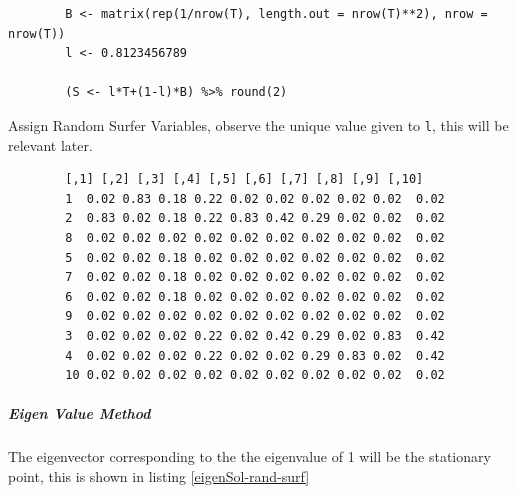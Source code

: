 \documentclass[11pt, twoside]{report}
\begin{document}
\begin{listing}[htbp]
    \begin{tcolorbox}
        \begin{verbatim}
        B <- matrix(rep(1/nrow(T), length.out = nrow(T)**2), nrow = nrow(T))
        l <- 0.8123456789

        (S <- l*T+(1-l)*B) %>% round(2)
        \end{verbatim}
        \caption{\label{r-var-random-surfer}Assign Random Surfer Variables, observe the unique value given to \texttt{l}, this will be relevant later.}
    \tcblower
        \begin{verbatim}
        [,1] [,2] [,3] [,4] [,5] [,6] [,7] [,8] [,9] [,10]
        1  0.02 0.83 0.18 0.22 0.02 0.02 0.02 0.02 0.02  0.02
        2  0.83 0.02 0.18 0.22 0.83 0.42 0.29 0.02 0.02  0.02
        8  0.02 0.02 0.02 0.02 0.02 0.02 0.02 0.02 0.02  0.02
        5  0.02 0.02 0.18 0.02 0.02 0.02 0.02 0.02 0.02  0.02
        7  0.02 0.02 0.18 0.02 0.02 0.02 0.02 0.02 0.02  0.02
        6  0.02 0.02 0.18 0.02 0.02 0.02 0.02 0.02 0.02  0.02
        9  0.02 0.02 0.02 0.02 0.02 0.02 0.02 0.02 0.02  0.02
        3  0.02 0.02 0.02 0.22 0.02 0.42 0.29 0.02 0.83  0.42
        4  0.02 0.02 0.02 0.22 0.02 0.02 0.29 0.83 0.02  0.42
        10 0.02 0.02 0.02 0.02 0.02 0.02 0.02 0.02 0.02  0.02
        \end{verbatim}
    \end{tcolorbox}
\end{listing}

\subparagraph{Eigen Value Method}
\label{eigen-value-method}
The eigenvector corresponding to the the eigenvalue of 1 will be the
stationary point, this is shown in listing \ref{eigenSol-rand-surf}
\end{document}
